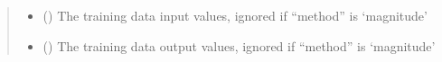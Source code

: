 \documentclass[letterpaper,10pt,english]{sphinxmanual}
\begin{document}
\begin{fulllineitems}
\begin{quote}
\begin{description}
\begin{itemize}
\item {} 
\sphinxAtStartPar
{} () \textendash{} The training data input values, ignored if “method” is ‘magnitude’

\item {} 
\sphinxAtStartPar
{} () \textendash{} The training data output values, ignored if “method” is ‘magnitude’

\end{itemize}

\end{description}\end{quote}

\end{fulllineitems}

\end{document}
